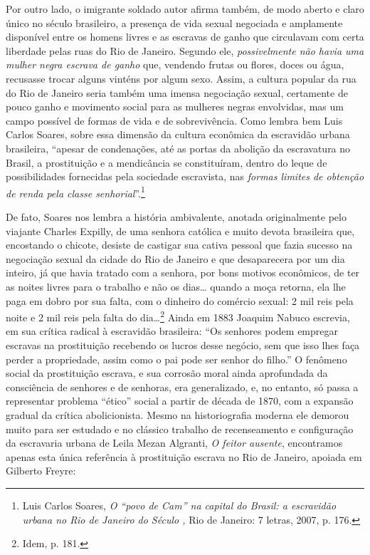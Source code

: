 Por outro lado, o imigrante soldado autor afirma também, de modo aberto
e claro único no século  brasileiro, a presença de vida sexual
negociada e amplamente disponível entre os homens livres e as escravas
de ganho que circulavam com certa liberdade pelas ruas do Rio de
Janeiro. Segundo ele, \emph{possivelmente não havia uma mulher negra
escrava de ganho} que, vendendo frutas ou flores, doces ou água,
recusasse trocar alguns vinténs por algum sexo. Assim, a cultura popular
da rua do Rio de Janeiro seria também uma imensa negociação sexual,
certamente de pouco ganho e movimento social para as mulheres negras
envolvidas, mas um campo possível de formas de vida e de sobrevivência.
Como lembra bem Luis Carlos Soares, sobre essa dimensão da cultura
econômica da escravidão urbana brasileira, ``apesar de condenações, até
as portas da abolição da escravatura no Brasil, a prostituição e a
mendicância se constituíram, dentro do leque de possibilidades
fornecidas pela sociedade escravista, nas \emph{formas limites de
obtenção de renda pela classe senhorial}''.\footnote{Luis Carlos Soares,
  \emph{O ``povo de Cam'' na capital do Brasil: a escravidão urbana no
  Rio de Janeiro do Século ,} Rio de Janeiro: 7 letras, 2007, p. 176.}

De fato, Soares nos lembra a história ambivalente, anotada originalmente
pelo viajante Charles Expilly, de uma senhora católica e muito devota
brasileira que, encostando o chicote, desiste de castigar sua cativa
pessoal que fazia sucesso na negociação sexual da cidade do Rio de
Janeiro e que desaparecera por um dia inteiro, já que havia tratado com
a senhora, por bons motivos econômicos, de ter as noites livres para o
trabalho e não os dias\ldots{} quando a moça retorna, ela lhe paga em dobro
por sua falta, com o dinheiro do comércio sexual: 2 mil reis pela noite
e 2 mil reis pela falta do dia\ldots{}\footnote{Idem, p. 181.} Ainda em 1883
Joaquim Nabuco escrevia, em sua crítica radical à escravidão brasileira:
``Os senhores podem empregar escravas na prostituição recebendo os
lucros desse negócio, sem que isso lhes faça perder a propriedade, assim
como o pai pode ser senhor do filho.'' O fenômeno social da prostituição
escrava, e sua corrosão moral ainda aprofundada da consciência de
senhores e de senhoras, era generalizado, e, no entanto, só passa a
representar problema ``ético'' social a partir de década de 1870, com a
expansão gradual da crítica abolicionista. Mesmo na historiografia
moderna ele demorou muito para ser estudado e no clássico trabalho de
recenseamento e configuração da escravaria urbana de Leila Mezan
Algranti, \emph{O feitor ausente}, encontramos apenas esta única
referência à prostituição escrava no Rio de Janeiro, apoiada em Gilberto
Freyre: 

